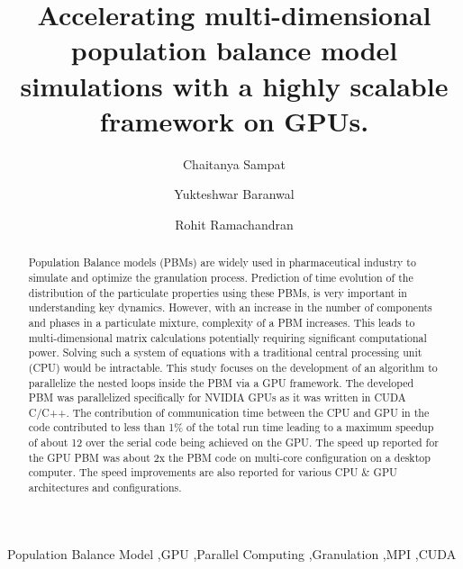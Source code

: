 \documentclass[preprint,10pt,authoryear,review]{elsarticle}
\begin{document}
\begin{frontmatter}
\title{Accelerating multi-dimensional population balance model simulations with a highly scalable framework on GPUs.}


\author[label1]{Chaitanya Sampat}
\author[label1]{Yukteshwar Baranwal}
\address[label1]{Chemical and Biochemical Engineering, 
Rutgers University, Piscataway, NJ, USA - 08854}
\author[label1]{Rohit Ramachandran}

\begin{abstract}
Population Balance models (PBMs) are widely used in pharmaceutical industry to simulate
and optimize the granulation process. Prediction of time evolution of the distribution 
of the particulate properties using these PBMs, is very important in understanding
key dynamics. However, with an increase in the number of components and phases in 
a particulate mixture, complexity of a PBM increases. This leads to multi-dimensional 
matrix calculations potentially requiring significant computational power. Solving 
such a system of equations with a traditional central processing unit (CPU) would 
be intractable.
This study focuses on the development of an algorithm to parallelize the nested 
loops inside the PBM via a GPU framework. The developed PBM was parallelized 
specifically for NVIDIA GPUs as it was written in CUDA C/C++. The contribution of 
communication time between the CPU and GPU in the code contributed to less than 1\% of 
the total run time leading to a maximum speedup of about 12 over the serial code being 
achieved on the GPU. The speed up reported for the GPU PBM was about 2x the PBM 
code on multi-core configuration on a desktop computer. The speed improvements 
are also reported for various CPU \& GPU architectures and configurations.
\end{abstract}

\begin{keyword}
Population Balance Model \sep GPU \sep Parallel Computing \sep Granulation \sep MPI \sep CUDA
\end{keyword}

\end{frontmatter}
\end{document}
